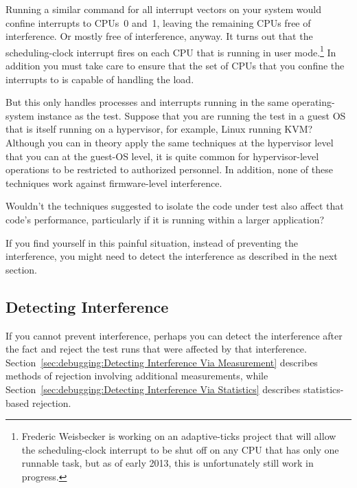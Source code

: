 Running a similar command for all interrupt vectors on your system
would confine interrupts to CPUs~0 and~1, leaving the remaining CPUs
free of interference.
Or mostly free of interference, anyway.
It turns out that the scheduling-clock interrupt fires on each CPU
that is running in user mode.\footnote{
	Frederic Weisbecker is working on an adaptive-ticks project
	that will allow the scheduling-clock interrupt to be shut
	off on any CPU that has only one runnable task, but as of
	early 2013, this is unfortunately still work in progress.}
In addition you must take care to ensure that the set of CPUs that you
confine the interrupts to is capable of handling the load.

But this only handles processes and interrupts running in the same
operating-system instance as the test.
Suppose that you are running the test in a guest OS that is itself
running on a hypervisor, for example, Linux running KVM?
Although you can in theory apply the same techniques at the hypervisor
level that you can at the guest-OS level, it is quite common for
hypervisor-level operations to be restricted to authorized personnel.
In addition, none of these techniques work against firmware-level
interference.

\QuickQuiz{}
	Wouldn't the techniques suggested to isolate the code under
	test also affect that code's performance, particularly if
	it is running within a larger application?
 \QuickQuizEnd

If you find yourself in this painful situation, instead of preventing
the interference, you might need to detect the interference as described
in the next section.

\subsection{Detecting Interference}
\label{sec:debugging:Detecting Interference}

If you cannot prevent interference, perhaps you can detect the
interference after the fact and reject the test runs that were affected
by that interference.
Section~\ref{sec:debugging:Detecting Interference Via Measurement}
describes methods of rejection involving additional measurements,
while Section~\ref{sec:debugging:Detecting Interference Via Statistics}
describes statistics-based rejection.

